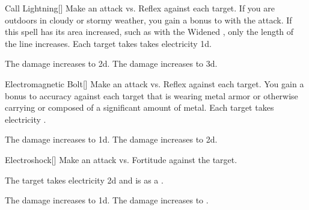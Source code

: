\lowercase{\hypertarget{spell:Call Lightning}{}}\label{spell:Call Lightning}
\begin{freeability}[Rank 3]{\hypertarget{spell:Call Lightning}{Call Lightning}}[]
Make an attack vs. Reflex against each target.
If you are outdoors in cloudy or stormy weather, you gain a  bonus to  with the attack.
If this spell has its area increased, such as with the Widened , only the length of the line increases.
\hit Each target takes takes electricity  \plus1d.


\rankline
{} The damage increases to  \plus2d.
 The damage increases to  \plus3d.
\end{freeability}
\vspace{0.25em}



\lowercase{\hypertarget{spell:Electromagnetic Bolt}{}}\label{spell:Electromagnetic Bolt}
\begin{freeability}[Rank 3]{\hypertarget{spell:Electromagnetic Bolt}{Electromagnetic Bolt}}[]
Make an attack vs. Reflex against each target.
You gain a  bonus to accuracy against each target that is wearing metal armor or otherwise carrying or composed of a significant amount of metal.
\hit Each target takes electricity .

\rankline
{} The damage increases to  \plus1d.
 The damage increases to  \plus2d.
\end{freeability}
\vspace{0.25em}



\lowercase{\hypertarget{spell:Electroshock}{}}\label{spell:Electroshock}
\begin{freeability}[Rank 3]{\hypertarget{spell:Electroshock}{Electroshock}}[]
Make an attack vs. Fortitude against the target.

\hit The target takes electricity  \minus2d and is  as a .

\rankline
{} The damage increases to  \minus1d.
 The damage increases to .
\end{freeability}
\vspace{0.25em}



